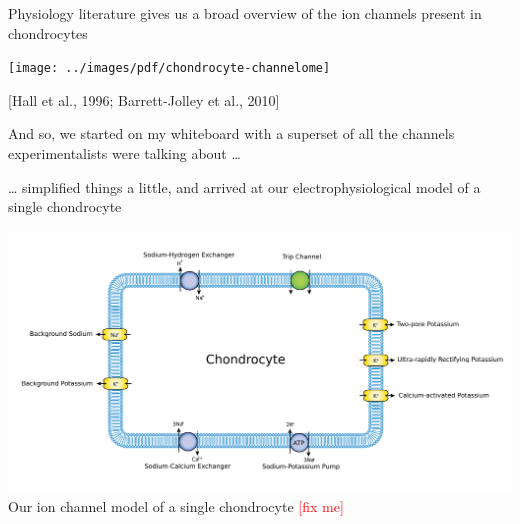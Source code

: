 \documentclass[ignorenonframetext]{beamer}
\newcommand{\references}[1] {
  \begin{flushright}
    \scriptsize [#1] \normalsize
  \end{flushright}
}
\newcommand{\fixme} {
  \scriptsize
  \textcolor{red}{[fix me]}
  \normalsize
}
\begin{document}
%
%
%

\begin{frame}{Physiology literature gives us a broad overview of the
    ion channels present in chondrocytes}

  \vspace{0.4cm}
  \texttt{[image: ../images/pdf/chondrocyte-channelome]}

  \references{Hall et al., 1996; Barrett-Jolley et al., 2010}

\end{frame}


\begin{frame}{And so, we started on my whiteboard with a superset of
    all the channels experimentalists were talking about \ldots}

  \begin{center}
  \end{center}

\end{frame}

%
%

\begin{frame}{\ldots{} simplified things a little, and arrived at our
    electrophysiological model of a single chondrocyte}

  \begin{center}
    \includegraphics[width=\textwidth]{../images/pdf/chondrocyte-model-cellml}
    {\\[-0.1cm] \scriptsize Our ion channel model of a single chondrocyte \fixme}
  \end{center}

\end{frame}
\end{document}
